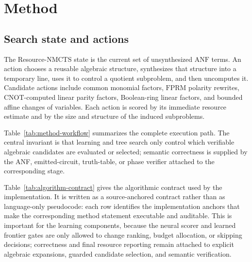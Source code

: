 \documentclass[11pt]{article}
\newcommand{\method}{Resource-NMCTS}
\newcommand{\anf}{\ensuremath{\mathrm{ANF}}}
\newcommand{\fprm}{\ensuremath{\mathrm{FPRM}}}
\begin{document}
\section{Method}

\subsection{Search state and actions}

The \method{} state is the current set of unsynthesized \anf{} terms.  An
action chooses a reusable algebraic structure, synthesizes that structure into
a temporary line, uses it to control a quotient subproblem, and then
uncomputes it.  Candidate actions include common monomial factors, \fprm{}
polarity rewrites, CNOT-computed linear parity factors, Boolean-ring linear
factors, and bounded affine changes of variables.  Each action is scored by
its immediate resource estimate and by the size and structure of the induced
subproblems.

Table~\ref{tab:method-workflow} summarizes the complete execution path.  The
central invariant is that learning and tree search only control which
verifiable algebraic candidates are evaluated or selected; semantic correctness
is supplied by the ANF, emitted-circuit, truth-table, or phase verifier attached
to the corresponding stage.

\begin{table}[H]
\centering
\scriptsize
\setlength{\tabcolsep}{2pt}
\renewcommand{\arraystretch}{1.05}
\caption{End-to-end synthesis and verification workflow.  Each stage records
the mechanism used by \method{}, the invariant that prevents the learned search
from becoming a semantic oracle, and the artifact produced for downstream
analysis.}
\label{tab:method-workflow}

\end{table}

Table~\ref{tab:algorithm-contract} gives the algorithmic contract used by the
implementation.  It is written as a source-anchored contract rather than as
language-only pseudocode: each row identifies the implementation anchors that
make the corresponding method statement executable and auditable.  This is
important for the learning components, because the neural scorer and learned
frontier gates are only allowed to change ranking, budget allocation, or
skipping decisions; correctness and final resource reporting remain attached
to explicit algebraic expansions, guarded candidate selection, and semantic
verification.
\end{document}
